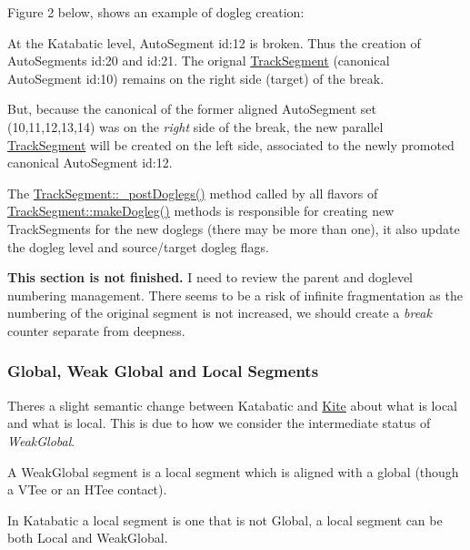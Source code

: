 Figure 2 below, shows an example of dogleg creation\+:
\begin{DoxyItemize}
\item At the Katabatic level, Auto\+Segment {\ttfamily id\+:12} is broken. Thus the creation of Auto\+Segments {\ttfamily id\+:20} and {\ttfamily id\+:21}. The orignal \hyperlink{classKite_1_1TrackSegment}{Track\+Segment} (canonical Auto\+Segment {\ttfamily id\+:10}) remains on the right side (target) of the break.
\item But, because the canonical of the former aligned Auto\+Segment set {\ttfamily }(10,11,12,13,14) was on the {\itshape right} side of the break, the new parallel \hyperlink{classKite_1_1TrackSegment}{Track\+Segment} will be created on the {\ttfamily left} side, associated to the newly promoted canonical Auto\+Segment {\ttfamily id\+:12}.
\end{DoxyItemize}

 The \hyperlink{classKite_1_1TrackSegment_a10a45c049d0bd7d01c7eff1c5441c7a2}{Track\+Segment\+::\+\_\+post\+Doglegs()} method called by all flavors of \hyperlink{classKite_1_1TrackSegment_a7a9637875364e84e6862de0102341715}{Track\+Segment\+::make\+Dogleg()} methods is responsible for creating new Track\+Segments for the new doglegs (there may be more than one), it also update the dogleg level and source/target dogleg flags.

{\bfseries This section is not finished.} I need to review the parent and doglevel numbering management. There seems to be a risk of infinite fragmentation as the numbering of the original segment is not increased, we should create a {\itshape break} counter separate from deepness.\hypertarget{classKite_1_1TrackSegment_secWeakGlobal}{}\subsubsection{Global, Weak Global and Local Segments}\label{classKite_1_1TrackSegment_secWeakGlobal}
There\textquotesingle{}s a slight semantic change between Katabatic and \hyperlink{namespaceKite}{Kite} about what is local and what is local. This is due to how we consider the intermediate status of {\itshape Weak\+Global}.

A {\ttfamily Weak\+Global} segment is a local segment which is aligned with a global (though a V\+Tee or an H\+Tee contact).

In Katabatic a local segment is one that is not {\ttfamily Global}, a local segment can be both {\ttfamily Local} and {\ttfamily Weak\+Global}.

